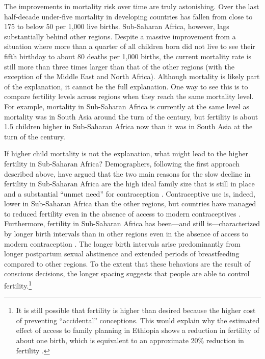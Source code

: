 The improvements in mortality risk over time are truly astonishing. Over the last half-decade under-five mortality in developing countries has fallen from close to 175 to below 50 per 1,000 live births. Sub-Saharan Africa, however, lags substantially behind other regions. Despite a massive improvement from a situation where more than a quarter of all children born did not live to see their fifth birthday to about 80 deaths per 1,000 births, the current mortality rate is still more than three times larger than that of the other regions (with the exception of the Middle East and North Africa). Although mortality is likely part of the explanation, it cannot be the full explanation. One way to see this is to compare fertility levels across regions when they reach the same mortality level. For example, mortality in Sub-Saharan Africa is currently at the same level as mortality was in South Asia around the turn of the century, but fertility is about 1.5 children higher in Sub-Saharan Africa now than it was in South Asia at the turn of the century.

If higher child mortality is not the explanation, what might lead to the higher fertility in Sub-Saharan Africa? Demographers, following the first approach described above, have argued that the two main reasons for the slow decline in fertility in Sub-Saharan Africa are the high ideal family size that is still in place and a substantial ``unmet need'' for contraception \citep{Bongaarts2013a,Casterline2017,Singh2017}. Contraceptive use is, indeed, lower in Sub-Saharan Africa than the other regions, but countries have managed to reduced fertility even in the absence of access to modern contraceptives \citet{Schultz1985,Galloway1987,Bailey1998,bengtsson06}. Furthermore, fertility in Sub-Saharan Africa has been---and still is---characterized by longer birth intervals than in other regions even in the absence of access to modern contraception \citep{Caldwell1992,Moultrie2012,Casterline2016}. The longer birth intervals arise predominantly from longer postpartum sexual abstinence and extended periods of breastfeeding compared to other regions. To the extent that these behaviors are the result of conscious decisions, the longer spacing suggests that people are able to control fertility.\footnote{It is still possible that fertility is higher than desired because the higher cost of preventing ``accidental'' conceptions. This would explain why the estimated effect of access to family planning in Ethiopia shows a reduction in fertility of about one birth, which is equivalent to an approximate 20\% reduction in fertility \citep{Portner2014a}.}

